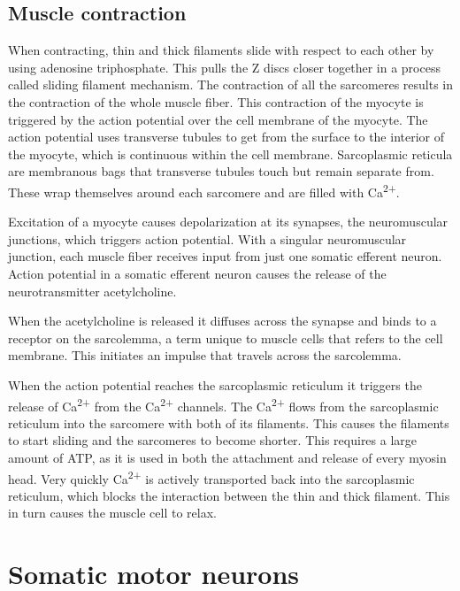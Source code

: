 \hypertarget{muscle-contraction}{%
\subsection{Muscle contraction}\label{muscle-contraction}}

When contracting, thin and thick filaments slide with respect to each other by using adenosine triphosphate. This pulls the Z discs closer together in a process called sliding filament mechanism. The contraction of all the sarcomeres results in the contraction of the whole muscle fiber. This contraction of the myocyte is triggered by the action potential over the cell membrane of the myocyte. The action potential uses transverse tubules to get from the surface to the interior of the myocyte, which is continuous within the cell membrane. Sarcoplasmic reticula are membranous bags that transverse tubules touch but remain separate from. These wrap themselves around each sarcomere and are filled with Ca\textsuperscript{2+}.

Excitation of a myocyte causes depolarization at its synapses, the neuromuscular junctions, which triggers action potential. With a singular neuromuscular junction, each muscle fiber receives input from just one somatic efferent neuron. Action potential in a somatic efferent neuron causes the release of the neurotransmitter acetylcholine.

When the acetylcholine is released it diffuses across the synapse and binds to a receptor on the sarcolemma, a term unique to muscle cells that refers to the cell membrane. This initiates an impulse that travels across the sarcolemma.

When the action potential reaches the sarcoplasmic reticulum it triggers the release of Ca\textsuperscript{2+} from the Ca\textsuperscript{2+} channels. The Ca\textsuperscript{2+} flows from the sarcoplasmic reticulum into the sarcomere with both of its filaments. This causes the filaments to start sliding and the sarcomeres to become shorter. This requires a large amount of ATP, as it is used in both the attachment and release of every myosin head. Very quickly Ca\textsuperscript{2+} is actively transported back into the sarcoplasmic reticulum, which blocks the interaction between the thin and thick filament. This in turn causes the muscle cell to relax.

\hypertarget{somatic-motor-neurons}{%
\section{Somatic motor neurons}\label{somatic-motor-neurons}}

